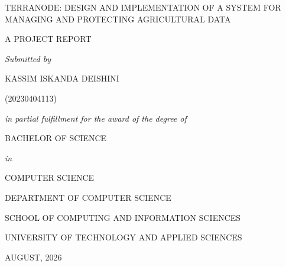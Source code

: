 \documentclass[12pt,a4paper]{report}
\begin{document}
\begin{titlepage}
    \centering
    \vspace*{0.5cm}
    
    {\fontsize{12pt}{18pt}\selectfont TERRANODE: DESIGN AND IMPLEMENTATION OF A SYSTEM FOR MANAGING AND PROTECTING AGRICULTURAL DATA\par}
    
    \vspace{1.5cm}
    
    {\fontsize{12pt}{18pt}\selectfont A PROJECT REPORT\par}
    
    \vspace{1.2cm}
    
    {\fontsize{12pt}{18pt}\selectfont\textit{Submitted by}\par}
    
    \vspace{0.4cm}
    
    {\fontsize{12pt}{18pt}\selectfont KASSIM ISKANDA DEISHINI\par}
    {\fontsize{12pt}{18pt}\selectfont (20230404113)\par}
    
    \vspace{1.5cm}
    
    {\fontsize{12pt}{18pt}\selectfont\textit{in partial fulfillment for the award of the degree of}\par}
    
    \vspace{0.4cm}
    
    {\fontsize{12pt}{18pt}\selectfont BACHELOR OF SCIENCE\par}
    
    \vspace{0.4cm}
    
    {\fontsize{12pt}{18pt}\selectfont\textit{in}\par}
    
    \vspace{0.4cm}
    
    {\fontsize{12pt}{18pt}\selectfont COMPUTER SCIENCE\par}
    
    \vspace{1.5cm}
    
    {\fontsize{12pt}{18pt}\selectfont DEPARTMENT OF COMPUTER SCIENCE\par}
    {\fontsize{12pt}{18pt}\selectfont SCHOOL OF COMPUTING AND INFORMATION SCIENCES\par}
    {\fontsize{12pt}{18pt}\selectfont UNIVERSITY OF TECHNOLOGY AND APPLIED SCIENCES\par}
    
    \vspace{1.0cm}
    
    {\fontsize{12pt}{18pt}\selectfont AUGUST, 2026\par}
    
\end{titlepage}
\end{document}
